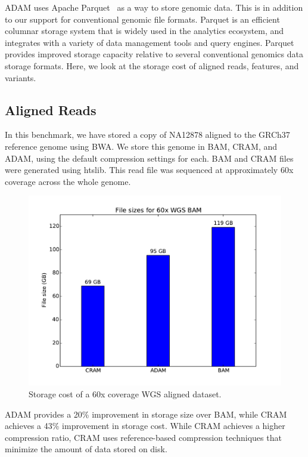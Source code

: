 \documentclass[phd]{ucbthesis}
\begin{document}
ADAM uses Apache Parquet~\cite{parquet} as a way to store genomic
data. This is in addition to our support for conventional genomic file formats.
Parquet is an efficient columnar storage system that is widely used in the
analytics ecosystem, and integrates with a variety of data management tools and
query engines. Parquet provides improved storage capacity relative to several
conventional genomics data storage formats. Here, we look at the storage cost of
aligned reads, features, and variants.

\subsection{Aligned Reads}
\label{sec:aligned-reads-storage}

In this benchmark, we have stored a copy of NA12878 aligned to the GRCh37
reference genome using BWA. We store this genome in BAM, CRAM, and ADAM, using
the default compression settings for each. BAM and CRAM files were generated
using htslib. This read file was sequenced at approximately 60x coverage across
the whole genome.

\begin{figure}[h]
  \begin{center}
    \includegraphics[width=0.95\linewidth]{graphs/bam.pdf}
  \end{center}
  \caption{Storage cost of a 60x coverage WGS aligned dataset.}
  \label{fig:read-storage}
\end{figure}

ADAM provides a 20\% improvement in storage size over BAM, while CRAM achieves
a 43\% improvement in storage cost. While CRAM achieves a higher compression
ratio, CRAM uses reference-based compression techniques that minimize the amount
of data stored on disk.
\end{document}
